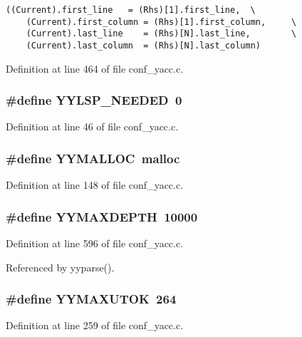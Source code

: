\footnotesize\begin{verbatim}((Current).first_line   = (Rhs)[1].first_line,  \
    (Current).first_column = (Rhs)[1].first_column,     \
    (Current).last_line    = (Rhs)[N].last_line,        \
    (Current).last_column  = (Rhs)[N].last_column)
\end{verbatim}\normalsize 


Definition at line 464 of file conf\_\-yacc.c.
\subsubsection{\setlength{\rightskip}{0pt plus 5cm}\#define YYLSP\_\-NEEDED\ 0}\label{conf__yacc_8c_a3}




Definition at line 46 of file conf\_\-yacc.c.
\subsubsection{\setlength{\rightskip}{0pt plus 5cm}\#define YYMALLOC\ malloc}\label{conf__yacc_8c_a18}




Definition at line 148 of file conf\_\-yacc.c.
\subsubsection{\setlength{\rightskip}{0pt plus 5cm}\#define YYMAXDEPTH\ 10000}\label{conf__yacc_8c_a57}




Definition at line 596 of file conf\_\-yacc.c.

Referenced by yyparse().
\subsubsection{\setlength{\rightskip}{0pt plus 5cm}\#define YYMAXUTOK\ 264}\label{conf__yacc_8c_a32}




Definition at line 259 of file conf\_\-yacc.c.
